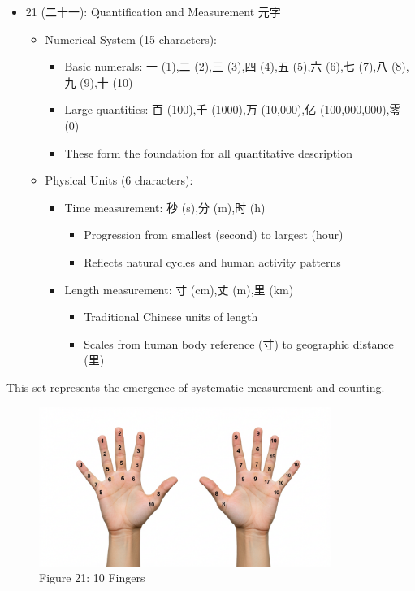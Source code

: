 \documentclass[
  11pt,
  letterpaper,
]{article}
\providecommand{\tightlist}{%
  \setlength{\itemsep}{0pt}\setlength{\parskip}{0pt}}
\begin{document}
\begin{itemize}
\tightlist
\item
  21 (二十一): Quantification and Measurement 元字

  \begin{itemize}
  \tightlist
  \item
    Numerical System (15 characters):

    \begin{itemize}
    \tightlist
    \item
      Basic numerals: 一 (1),二 (2),三 (3),四 (4),五 (5),六 (6),七
      (7),八 (8),九 (9),十 (10)
    \item
      Large quantities: 百 (100),千 (1000),万 (10,000),亿
      (100,000,000),零 (0)
    \item
      These form the foundation for all quantitative description
    \end{itemize}
  \item
    Physical Units (6 characters):

    \begin{itemize}
    \tightlist
    \item
      Time measurement: 秒 (s),分 (m),时 (h)

      \begin{itemize}
      \tightlist
      \item
        Progression from smallest (second) to largest (hour)
      \item
        Reflects natural cycles and human activity patterns
      \end{itemize}
    \item
      Length measurement: 寸 (cm),丈 (m),里 (km)

      \begin{itemize}
      \tightlist
      \item
        Traditional Chinese units of length
      \item
        Scales from human body reference (寸) to geographic distance
        (里)
      \end{itemize}
    \end{itemize}
  \end{itemize}
\end{itemize}

This set represents the emergence of systematic measurement and
counting.

\begin{figure}
\centering
\includegraphics[width=0.85\textwidth]{./images/10-fingers.jpg}
\caption{Figure 21: 10 Fingers}
\end{figure}
\end{document}
